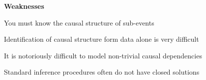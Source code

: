 \documentclass[landscape,footrule]{foils}
\begin{document}
\textbf{Weaknesses}
\begin{triangles}
\item You must know the causal structure of sub-events  
\item Identification of causal structure form data alone is very difficult
\item It is notoriously difficult to model non-trivial causal dependencies
\item Standard inference procedures often do not have closed solutions 
\end{triangles}
\end{document}
